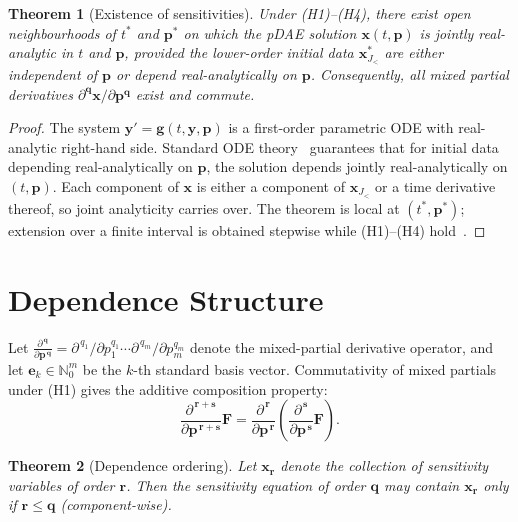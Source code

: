 \documentclass[12pt,a4paper]{article}
\theoremstyle{definition}
\theoremstyle{plain}
\newtheorem{theorem}{Theorem}[section]
\theoremstyle{remark}
\newcommand{\vx}{\mathbf{x}}
\newcommand{\vp}{\mathbf{p}}
\newcommand{\vq}{\mathbf{q}}
\newcommand{\vr}{\mathbf{r}}
\newcommand{\vs}{\mathbf{s}}
\newcommand{\vF}{\mathbf{F}}
\newcommand{\vy}{\mathbf{y}}
\newcommand{\vg}{\mathbf{g}}
\newcommand{\D}[2]{\frac{\partial^{\,#2}}{\partial #1^{\,#2}}}
\begin{document}
\begin{theorem}[Existence of sensitivities]
\label{thm:existence}
Under (H1)--(H4), there exist open neighbourhoods of $t^*$ and $\vp^*$ on which the pDAE solution $\vx(t,\vp)$ is jointly real-analytic in $t$ and $\vp$, provided the lower-order initial data $\vx_{J_<}^*$ are either independent of $\vp$ or depend real-analytically on $\vp$. Consequently, all mixed partial derivatives $\partial^{\vq}\vx/\partial\vp^{\vq}$ exist and commute.
\end{theorem}

\begin{proof}
The system $\vy'=\vg(t,\vy,\vp)$ is a first-order parametric ODE with real-analytic right-hand side. Standard ODE theory~\cite{coddington1955theory,hairer1993solving} guarantees that for initial data depending real-analytically on $\vp$, the solution depends jointly real-analytically on $(t,\vp)$. Each component of $\vx$ is either a component of $\vx_{J_<}$ or a time derivative thereof, so joint analyticity carries over. The theorem is local at $(t^*,\vp^*)$; extension over a finite interval is obtained stepwise while (H1)--(H4) hold~\cite{pryce2001simple,nedialkov2008solving}.
\end{proof}

\section{Dependence Structure}\label{sec:structural}

Let $\D{\vp}{\vq} = \partial^{\,q_1}/\partial p_1^{q_1} \cdots \partial^{\,q_m}/\partial p_m^{q_m}$ denote the mixed-partial derivative operator, and let $\mathbf{e}_k\in\mathbb{N}_0^m$ be the $k$-th standard basis vector. Commutativity of mixed partials~\cite{krantz2002implicit} under (H1) gives the additive composition property:
\begin{equation}\label{eq:additive}
  \D{\vp}{\vr+\vs}\vF = \D{\vp}{\vr}(\D{\vp}{\vs}\vF).
\end{equation}

\begin{theorem}[Dependence ordering]
\label{thm:appear}
Let $\vx_\vr$ denote the collection of sensitivity variables of order $\vr$. Then the sensitivity equation of order $\vq$ may contain $\vx_\vr$ only if $\vr \leq \vq$ (component-wise).
\end{theorem}
\end{document}
